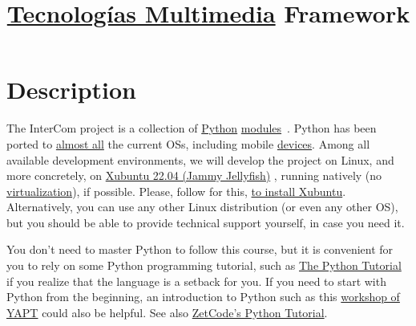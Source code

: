 
\title{\href{https://tecnologias-multimedia.github.io/}{Tecnologías Multimedia} \newline Framework}

\maketitle

\section{Description}

The InterCom project \cite{intercom} is a collection of
\href{https://www.python.org/}{Python}
\href{https://docs.python.org/3/tutorial/modules.html#modules}{modules}~\cite{python}.
Python has been ported to
\href{https://www.python.org/download/other/}{almost all} the current
OSs, including mobile \href{https://kivy.org/#home}{devices}. Among
all available development environments, we will develop the project on
Linux, and more concretely, on
\href{https://xubuntu.org/download/}{Xubuntu 22.04 (Jammy Jellyfish)}
\cite{xubuntu}, running natively (no
\href{https://en.wikipedia.org/wiki/Virtualization}{virtualization}),
if possible. Please, follow for this,
\href{https://vicente-gonzalez-ruiz.github.io/Xubuntu_install/}{to
  install Xubuntu}. Alternatively, you can use any other Linux
distribution (or even any other OS), but you should be able to
provide technical support yourself, in case you need it.

You don't need to master Python to follow this course, but it is
convenient for you to rely on some Python programming tutorial, such
as \href{https://docs.python.org/3/tutorial/}{The Python Tutorial}
\cite{python-tutorial} if you realize that the language is a setback
for you. If you need to start with Python from the beginning, an
introduction to Python such as this
\href{https://github.com/vicente-gonzalez-ruiz/YAPT/tree/master/workshops/programacion_python_ESO}{workshop
  of YAPT} \cite{YAPT} could also be helpful. See also
\href{http://zetcode.com/lang/python/}{ZetCode's Python
  Tutorial}.

